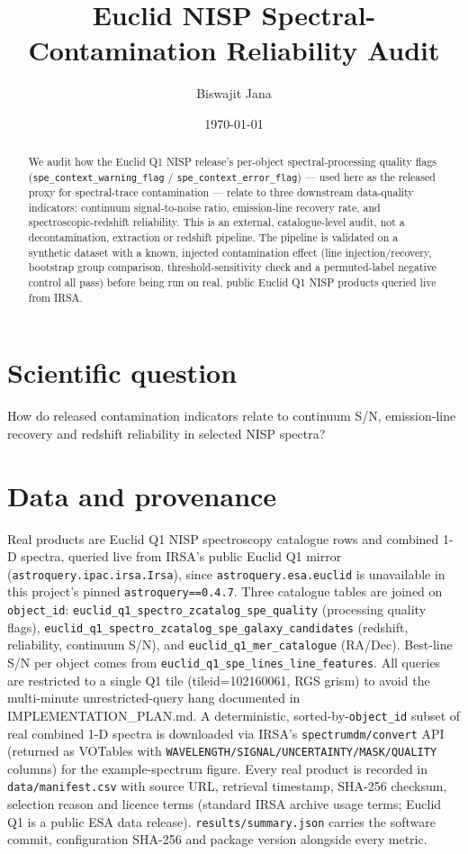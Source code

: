 \documentclass[11pt]{article}
\title{Euclid NISP Spectral-Contamination Reliability Audit}
\author{Biswajit Jana}
\date{\today}
\begin{document}
\maketitle

\begin{abstract}
We audit how the Euclid Q1 NISP release's per-object spectral-processing quality flags
(\texttt{spe\_context\_warning\_flag} / \texttt{spe\_context\_error\_flag}) — used here as the released
proxy for spectral-trace contamination — relate to three downstream data-quality indicators: continuum
signal-to-noise ratio, emission-line recovery rate, and spectroscopic-redshift reliability. This is an
external, catalogue-level audit, not a decontamination, extraction or redshift pipeline. The pipeline is
validated on a synthetic dataset with a known, injected contamination effect (line injection/recovery,
bootstrap group comparison, threshold-sensitivity check and a permuted-label negative control all pass)
before being run on real, public Euclid Q1 NISP products queried live from IRSA.
\end{abstract}

\section{Scientific question}
How do released contamination indicators relate to continuum S/N, emission-line recovery and redshift
reliability in selected NISP spectra?

\section{Data and provenance}
Real products are Euclid Q1 NISP spectroscopy catalogue rows and combined 1-D spectra, queried live from
IRSA's public Euclid Q1 mirror (\texttt{astroquery.ipac.irsa.Irsa}), since \texttt{astroquery.esa.euclid}
is unavailable in this project's pinned \texttt{astroquery==0.4.7}. Three catalogue tables are joined on
\texttt{object\_id}: \texttt{euclid\_q1\_spectro\_zcatalog\_spe\_quality} (processing quality flags),
\texttt{euclid\_q1\_spectro\_zcatalog\_spe\_galaxy\_candidates} (redshift, reliability, continuum S/N), and
\texttt{euclid\_q1\_mer\_catalogue} (RA/Dec). Best-line S/N per object comes from
\texttt{euclid\_q1\_spe\_lines\_line\_features}. All queries are restricted to a single Q1 tile
(tileid=102160061, RGS grism) to avoid the multi-minute unrestricted-query hang documented in
IMPLEMENTATION\_PLAN.md. A deterministic, sorted-by-\texttt{object\_id} subset of real combined 1-D
spectra is downloaded via IRSA's \texttt{spectrumdm/convert} API (returned as VOTables with
\texttt{WAVELENGTH/SIGNAL/UNCERTAINTY/MASK/QUALITY} columns) for the example-spectrum figure. Every real
product is recorded in \texttt{data/manifest.csv} with source URL, retrieval timestamp, SHA-256 checksum,
selection reason and licence terms (standard IRSA archive usage terms; Euclid Q1 is a public ESA data
release). \texttt{results/summary.json} carries the software commit, configuration SHA-256 and package
version alongside every metric.
\end{document}
